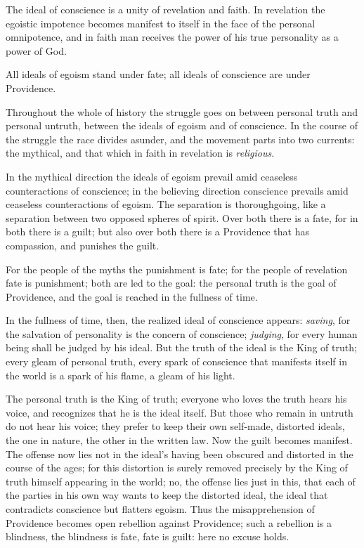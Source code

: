 \documentclass[12pt,a4paper,openany]{book}
\newcommand{\opage}[1]{\marginnote{\footnotesize\textit{[#1]}}}
\begin{document}
The ideal of conscience is a unity of revelation
and faith. In revelation the
egoistic impotence becomes manifest to itself in the face of
the personal omnipotence, and in faith man receives
the power of his true personality as a
power of God.

\setcounter{footnote}{0}%
\opage{51}All ideals of egoism stand under fate;
all ideals of conscience are under
Providence.

Throughout the whole of history the struggle goes on between
personal truth and personal untruth,
between the ideals of egoism and of conscience. In the course of the struggle the race divides
asunder, and the movement parts into two currents:
the mythical, and that which in faith in revelation is \emph{religious}.

In the mythical direction the ideals of egoism
prevail amid ceaseless counteractions of conscience;
in the believing direction conscience prevails
amid ceaseless counteractions of
egoism. The separation is thoroughgoing, like a
separation between two opposed
spheres of spirit. Over both there is a fate,
for in both there is a guilt; but also over
both there is a Providence that has compassion, and
punishes the guilt.

For the people of the myths the punishment is fate;
for the people of revelation fate is punishment;
both are led to the goal: the personal truth
is the goal of Providence, and the goal is reached in
the fullness of time. 

\setcounter{footnote}{0}%
\opage{52}In the fullness of time, then, the realized
ideal of conscience appears: \emph{saving}, for
the salvation of personality is the concern of conscience;
\emph{judging}, for every human being shall be judged
by his ideal. But the truth of the ideal is the King
of truth; every gleam of personal truth,
every spark of conscience that manifests itself
in the world is a spark of his flame, a
gleam of his light.

The personal truth is the King of
truth; everyone who loves the truth hears
his voice, and recognizes that he is the ideal itself.
But those who remain in untruth do not hear
his voice; they prefer to keep their own
self-made, distorted ideals, the one in nature,
the other in the written law. Now the
guilt becomes manifest. The offense now lies not
in the ideal's having been obscured and distorted  %
in the course of the ages; for this distortion
is surely removed precisely by the King of truth
himself appearing in the world; no, the offense lies just
in this, that each of the parties in his own way wants to
keep the distorted ideal, the ideal that
contradicts conscience but flatters egoism.
Thus the misapprehension of
\setcounter{footnote}{0}%
\opage{53}Providence becomes open rebellion against Providence;
such a rebellion is a blindness, the blindness
is fate, fate is guilt: here
no excuse holds.
\end{document}
